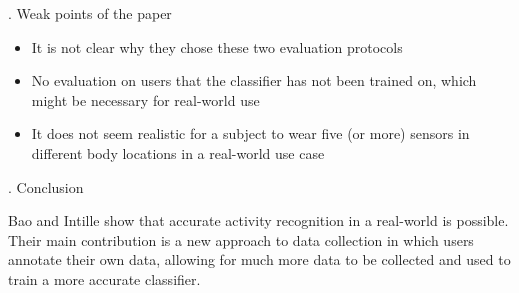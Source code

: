 \documentclass[12pt]{article}
\newenvironment{indentpar}
    {\vspace{0.25cm}\hfill\begin{minipage}{\dimexpr\textwidth-1cm}}
    {\end{minipage}\vspace{0.3cm}}
\begin{document}
. Weak points of the paper

\begin{itemize}
    \item It is not clear why they chose these two evaluation protocols
    \item No evaluation on users that the classifier has not been trained on, which might be necessary for real-world use
    \item It does not seem realistic for a subject to wear five (or more) sensors in different body locations in a real-world use case
\end{itemize}

. Conclusion

\begin{indentpar}
Bao and Intille show that accurate activity recognition in a real-world is possible. Their main contribution is a new approach to data collection in which users annotate their own data, allowing for much more data to be collected and used to train a more accurate classifier.
\end{indentpar}
\end{document}
